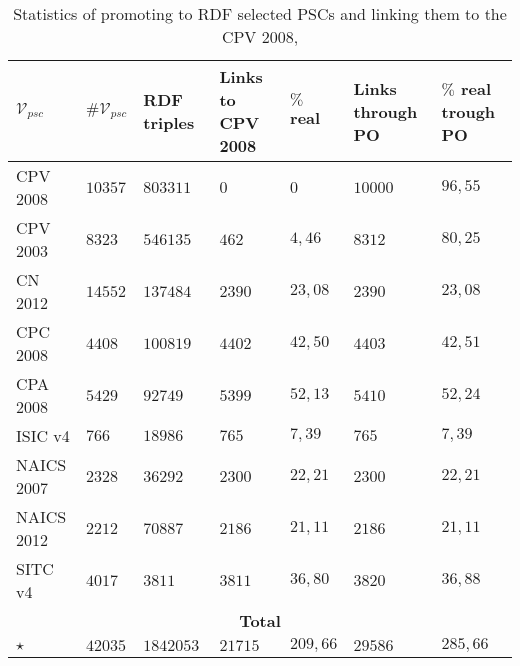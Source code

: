 \begin{table}[!htb]
\renewcommand{\arraystretch}{1.3}
\begin{center}
\begin{tabular}[c]{|p{2.2cm}|p{1.6cm}|p{1.8cm}|p{1.6cm}|p{1.6cm}|p{1.8cm}|p{1.6cm}|}
 
 \hline
  $\mathcal{V}_{psc}$ & $\#\mathcal{V}_{psc}$  & RDF triples &Links to CPV 2008 &  $\%$ real & Links through PO & $\%$ real trough PO    \\\hline

CPV 2008 	& $10357$  	& $803311$	& $0$	 	& $0$	 	& $10000$	& $96,55$	  \\ \hline
CPV 2003 	& $8323$  	& $546135$	& $462$ 	& $4,46$ 	& $8312$	& $80,25$	 \\ \hline
CN 2012  	& $14552$	& $137484$	& $2390$ 	& $23,08$	& $2390$	& $23,08$	  \\ \hline
CPC 2008 	& $4408$	& $100819$   	& $4402$	& $42,50$	& $4403$	& $42,51$ 	  \\ \hline
CPA 2008 	& $5429$	& $92749$   	& $5399$	& $52,13$	& $5410$	& $52,24$	  \\ \hline
ISIC v4  	& $766$		& $18986$   	& $765$ 	& $7,39$ 	& $765$		& $7,39$	   \\ \hline
NAICS 2007 	& $2328$	& $36292$ 	& $2300$	& $22,21$	& $2300$	& $22,21$	 \\ \hline
NAICS 2012 	& $2212$	& $70887$ 	& $2186$	& $21,11$	& $2186$	& $21,11$	  \\ \hline
SITC v4 	& $4017$	& $3811$   	& $3811$	& $36,80$	& $3820$	& $36,88$	 \\ \hline
\multicolumn{7}{|c|}{\textbf{Total}} \\ \hline
$\star$ 	& $42035$ 	& $1842053$	& $21715$   	& $209,66$	& $29586$ 	& $285,66$	 \\ \hline
\hline
  \end{tabular}
  \caption{Statistics of promoting to RDF selected PSCs and linking them to the CPV 2008,}\label{ganancia-terminos}  
  
  \end{center}
\end{table}



